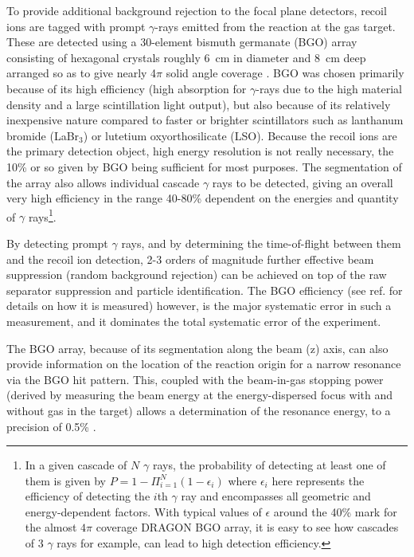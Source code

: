 To provide additional background rejection to the focal plane detectors, recoil ions are tagged with prompt $\gamma$-rays emitted from the reaction at the gas target. These are detected using a 30-element bismuth germanate (BGO) array consisting of hexagonal crystals roughly 6~cm in diameter and 8~cm deep arranged so as to give nearly 4$\pi$ solid angle coverage \cite{gig03}. BGO was chosen primarily because of its high efficiency (high absorption for $\gamma$-rays due to the high material density and a large scintillation light output), but also because of its relatively inexpensive nature compared to faster or brighter scintillators such as lanthanum bromide (LaBr$_{3}$) or lutetium oxyorthosilicate (LSO). Because the recoil ions are the primary detection object, high energy resolution is not really necessary, the 10\% or so given by BGO being sufficient for most purposes. The segmentation of the array also allows individual cascade $\gamma$ rays to be detected, giving an overall very high efficiency in the range 40-80\% dependent on the energies and quantity of $\gamma$ rays\footnote{In a given cascade of $N$ $\gamma$ rays, the probability of detecting at least one of them is given by $P=1-\Pi^{N}_{i=1}(1-\epsilon_{i})$ where $\epsilon_i$ here represents the efficiency of detecting the $i$th $\gamma$ ray and encompasses all geometric and energy-dependent factors. With typical values of $\epsilon$ around the 40\% mark for the almost $4\pi$ coverage DRAGON BGO array, it is easy to see how cascades of 3 $\gamma$ rays for example, can lead to high detection efficiency.}. 

By detecting prompt $\gamma$ rays, and by determining the time-of-flight between them and the recoil ion detection, 2-3 orders of magnitude further effective beam suppression (random background rejection) can be achieved on top of the raw separator suppression and particle identification. The BGO efficiency (see ref. \cite{gig03} for details on how it is measured) however, is the major systematic error in such a measurement, and it dominates the total systematic error of the experiment.  

The BGO array, because of its segmentation along the beam (z) axis, can also provide information on the location of the reaction origin for a narrow resonance via the BGO hit pattern. This, coupled with the beam-in-gas stopping power (derived by measuring the beam energy at the energy-dispersed focus with and without gas in the target) allows a determination of the resonance energy, to a precision of 0.5\% \cite{hut12}.
 
